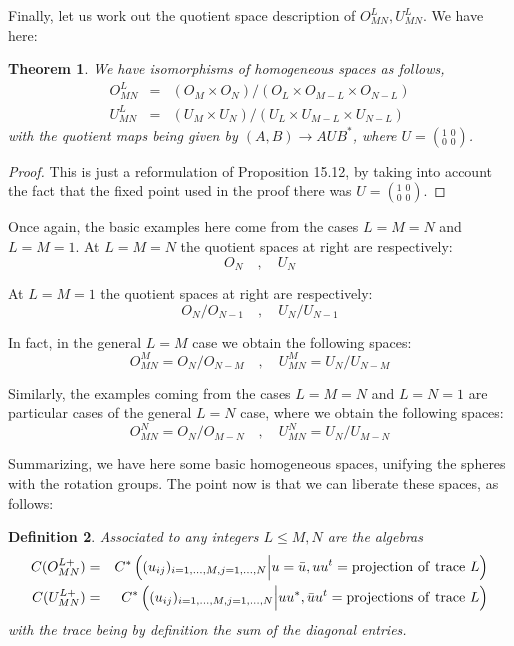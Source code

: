 \documentclass[12pt]{amsbook}
\newtheorem{theorem}{Theorem}[chapter]
\newtheorem{definition}[theorem]{Definition}
\begin{document}
Finally, let us work out the quotient space description of $O_{MN}^L,U_{MN}^L$. We have here:

\begin{theorem}
We have isomorphisms of homogeneous spaces as follows,
\begin{eqnarray*}
O_{MN}^L&=&(O_M\times O_N)/(O_L\times O_{M-L}\times O_{N-L})\\
U_{MN}^L&=&(U_M\times U_N)/(U_L\times U_{M-L}\times U_{N-L})
\end{eqnarray*}
with the quotient maps being given by $(A,B)\to AUB^*$, where $U=(^1_0{\ }^0_0)$.
\end{theorem}

\begin{proof}
This is just a reformulation of Proposition 15.12, by taking into account the fact that the fixed point used in the proof there was $U=(^1_0{\ }^0_0)$.
\end{proof}

Once again, the basic examples here come from the cases $L=M=N$ and $L=M=1$. At $L=M=N$ the quotient spaces at right are respectively:
$$O_N\quad,\quad U_N$$

At $L=M=1$  the quotient spaces at right are respectively:
$$O_N/O_{N-1}\quad,\quad U_N/U_{N-1}$$

In fact, in the general $L=M$ case we obtain the following spaces:
$$O_{MN}^M=O_N/O_{N-M}
\quad,\quad 
U_{MN}^M=U_N/U_{N-M}$$

Similarly, the examples coming from the cases $L=M=N$ and $L=N=1$ are particular cases of the general $L=N$ case, where we obtain the following spaces:
$$O_{MN}^N=O_N/O_{M-N}
\quad,\quad 
U_{MN}^N=U_N/U_{M-N}$$

Summarizing, we have here some basic homogeneous spaces, unifying the spheres with the rotation groups. The point now is that we can liberate these spaces, as follows:


\begin{definition}
Associated to any integers $L\leq M,N$ are the algebras
\begin{eqnarray*}
C(O_{MN}^{L+})&=&C^*\left((u_{ij})_{i=1,\ldots,M,j=1,\ldots,N}\Big|u=\bar{u},uu^t={\rm projection\ of\ trace}\ L\right)\\
C(U_{MN}^{L+})&=&C^*\left((u_{ij})_{i=1,\ldots,M,j=1,\ldots,N}\Big|uu^*,\bar{u}u^t={\rm projections\ of\ trace}\ L\right)
\end{eqnarray*}
with the trace being by definition the sum of the diagonal entries.
\end{definition}
\end{document}
